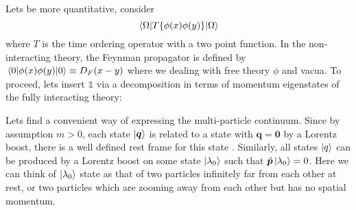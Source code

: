 Lets be more quantitative, consider
\begin{equation}
    \mel{\Omega}{T\{ \phi(x) \phi(y) \}}{\Omega}
\end{equation}
where $T$ is the time ordering operator with a two point function. In the non-interacting theory, the Feynman propagator is defined by $\mel{0}{\phi(x) \phi(y)}{0} \equiv D_{F}(x - y)$ where we dealing with free theory $\phi$ and vacua. To proceed, lets insert $\mathds{1}$ via a decomposition in  terms of momentum eigenstates of the fully interacting theory: 

Lets find a convenient way of expressing the multi-particle continuum. Since by assumption $m>0$, each state $\ket{\bm{q}}$ is related to a state with $\bm{q} = \bm{0}$ by a Lorentz boost, there is a well defined rest frame for this state . Similarly, all states $\ket{q}$ can be produced by a Lorentz boost on some state $\ket{\lambda_0}$ such that $\hat{\bm{p}}\ket{\lambda_0} = 0$.  Here we can think of $\ket{\lambda_0}$ state as that of two particles infinitely far from each other at rest,  or two particles which are zooming away from each other but has no spatial momentum. 

